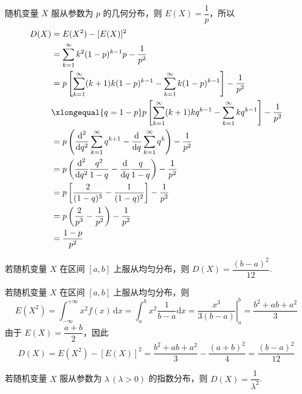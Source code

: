 \begin{myproof}
    随机变量 $X$ 服从参数为 $p$ 的几何分布，则 $E(X) = \dfrac{1}{p}$，所以
    $$
    \begin{aligned}
        D(X) &= E(X^2) - [E(X)]^2 \\
        &= \sum_{k=1}^{\infty} k^2 (1-p)^{k-1} p - \dfrac{1}{p^2} \\
        &= p \left[ \sum_{k=1}^{\infty} (k+1)k (1-p)^{k-1} - \sum_{k=1}^{\infty} k (1-p)^{k-1} \right] - \dfrac{1}{p^2} \\
        & \xlongequal{q=1-p} p \left[ \sum_{k=1}^{\infty} (k+1)k q^{k-1} - \sum_{k=1}^{\infty} k q^{k-1} \right] - \dfrac{1}{p^2} \\
        &= p \left( \dfrac{\text{d}^2}{\text{d}q^2} \sum_{k=1}^{\infty} q^{k+1} - \dfrac{\text{d}}{\text{d}q} \sum_{k=1}^{\infty} q^k \right) - \dfrac{1}{p^2} \\
        &= p \left( \dfrac{\text{d}^2}{\text{d}q^2} \dfrac{q^2}{1-q} - \dfrac{\text{d}}{\text{d}q} \dfrac{q}{1-q} \right) - \dfrac{1}{p^2} \\
        &= p \left[ \dfrac{2}{(1-q)^3} - \dfrac{1}{(1-q)^2} \right] - \dfrac{1}{p^2} \\
        &= p \left( \dfrac{2}{p^3} - \dfrac{1}{p^2} \right) - \dfrac{1}{p^2} \\
        &= \dfrac{1-p}{p^2}
    \end{aligned}
    $$

    \vspace{-2.2em}
\end{myproof}

\begin{conclusion}
    若随机变量 $X$ 在区间 $[a,b]$ 上服从均匀分布，则 $D(X) = \dfrac{(b-a)^2}{12}$.
\end{conclusion}

\begin{myproof}
    若随机变量 $X$ 在区间 $[a,b]$ 上服从均匀分布，则
    $$
    E(X^2) = \int_{-\infty}^{+\infty} x^2 f(x) \, \text{d}x = \int_a^b x^2 \dfrac{1}{b-a} \text{d}x = \left. \dfrac{x^3}{3(b-a)} \right|_a^b = \dfrac{b^2 + ab + a^2}{3}
    $$
    由于 $E(X) = \dfrac{a+b}{2}$，因此
    $$
    D(X) = E(X^2) - [E(X)]^2 = \dfrac{b^2 + ab + a^2}{3} - \dfrac{(a+b)^2}{4} = \dfrac{(b-a)^2}{12}
    $$

    \vspace{-2.5em}
\end{myproof}

\begin{conclusion}
    若随机变量 $X$ 服从参数为 $\lambda \, (\lambda > 0)$ 的指数分布，则 $D(X) = \dfrac{1}{\lambda^2}$.
\end{conclusion}

